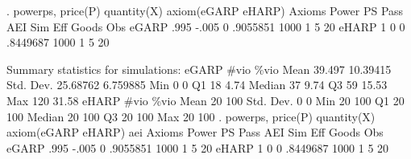 . powerps, price(P) quantity(X) axiom(eGARP eHARP)
{\smallskip}
      Axioms {\VBAR}     Power         PS       Pass        AEI        Sim        Eff      Goods        Obs 
       eGARP {\VBAR}      .995      -.005          0   .9055851       1000          1          5         20 
       eHARP {\VBAR}         1          0          0   .8449687       1000          1          5         20 
 
Summary statistics for simulations:
{\smallskip}
       eGARP {\VBAR}      \#vio       \%vio 
        Mean {\VBAR}    39.497   10.39415 
   Std. Dev. {\VBAR}  25.68762   6.759885 
         Min {\VBAR}         0          0 
          Q1 {\VBAR}        18       4.74 
      Median {\VBAR}        37       9.74 
          Q3 {\VBAR}        59      15.53 
         Max {\VBAR}       120      31.58 
{\smallskip}
{\smallskip}
       eHARP {\VBAR}      \#vio       \%vio 
        Mean {\VBAR}        20        100 
   Std. Dev. {\VBAR}         0          0 
         Min {\VBAR}        20        100 
          Q1 {\VBAR}        20        100 
      Median {\VBAR}        20        100 
          Q3 {\VBAR}        20        100 
         Max {\VBAR}        20        100 
{\smallskip}
{\smallskip}
. powerps, price(P) quantity(X) axiom(eGARP eHARP) aei
{\smallskip}
      Axioms {\VBAR}     Power         PS       Pass        AEI        Sim        Eff      Goods        Obs 
       eGARP {\VBAR}      .995      -.005          0   .9055851       1000          1          5         20 
       eHARP {\VBAR}         1          0          0   .8449687       1000          1          5         20 
 
